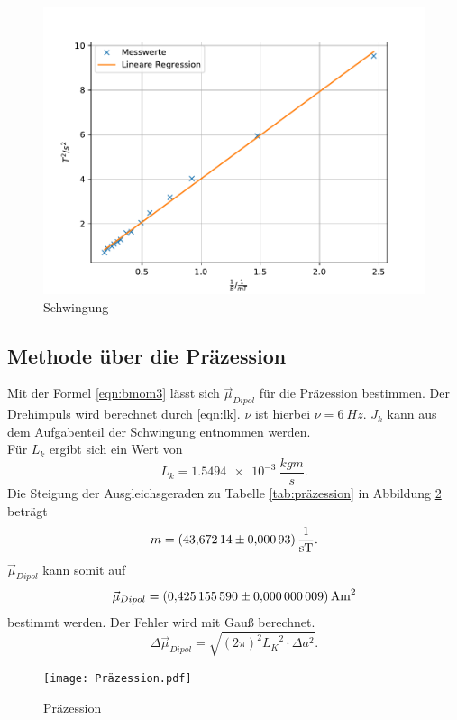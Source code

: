 
\newpage
\begin{figure}[h!]
   \centering
   \includegraphics[width=\textwidth]{Schwingung.pdf}
   \caption{Schwingung}
   \label{fig:schwing}
 \end{figure}

\subsection{Methode über die Präzession}
Mit der Formel \eqref{eqn:bmom3} lässt sich $\vec{\mu}_{Dipol}$ für die Präzession bestimmen.
Der Drehimpuls wird berechnet durch \eqref{eqn:lk}. $\nu$ ist hierbei $\nu = \SI{6}{Hz}$.
$J_k$ kann aus dem Aufgabenteil der Schwingung entnommen werden.
\\Für $L_k$ ergibt sich ein Wert von
\begin{equation*}
  L_k = \SI{1.5494e-3}{\frac{kg m}{s}}.
\end{equation*}
Die Steigung der Ausgleichsgeraden zu Tabelle \ref{tab:präzession} in Abbildung \ref{fig:präzession} beträgt\\
\begin{equation*}
 m=\SI{43.67214 \pm 0.00093}{\frac {1}{s T}}.
\end{equation*}
 $\vec{\mu}_{Dipol}$ kann somit auf\\
\begin{equation*}
  \vec{\mu}_{Dipol} = \SI{0.42515559 \pm 0.000000009}{A m^2}
\end{equation*}
 bestimmt werden. Der Fehler wird mit Gauß berechnet.\\
\begin{equation*}
  \Delta \vec{\mu}_{Dipol}=\sqrt{ (2 \pi)^2 {L_K}^2 \cdot \Delta a^2}.
\end{equation*}

\newpage

\begin{figure}[h!]
   \centering
   \texttt{[image: Präzession.pdf]}
   \caption{Präzession}
   \label{fig:präzession}
 \end{figure}
